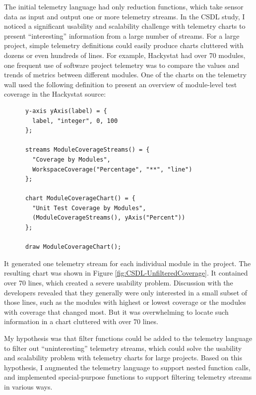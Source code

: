 The initial telemetry language had only reduction functions, which take sensor data as input and output one or more telemetry streams. In the CSDL study, I noticed a significant usability and scalability challenge with telemetry charts to present ``interesting'' information from a large number of streams. For a large project, simple telemetry definitions could easily produce charts cluttered with dozens or even hundreds of lines. For example, Hackystat had over 70 modules, one frequent use of software project telemetry was to compare the values and trends of metrics between different modules. One of the charts on the telemetry wall used the following definition to present an overview of module-level test coverage in the Hackystat source: 

\begin{verbatim}
      y-axis yAxis(label) = {
        label, "integer", 0, 100
      };

      streams ModuleCoverageStreams() = {
        "Coverage by Modules",
        WorkspaceCoverage("Percentage", "**", "line")
      };

      chart ModuleCoverageChart() = {
        "Unit Test Coverage by Modules",
        (ModuleCoverageStreams(), yAxis("Percent"))
      };

      draw ModuleCoverageChart();
\end{verbatim}

It generated one telemetry stream for each individual module in the project. The resulting chart was shown in Figure \ref{fig:CSDL-UnfilteredCoverage}. It contained over 70 lines, which created a severe usability problem. Discussion with the developers revealed that they generally were only interested in a small subset of those lines, such as the modules with highest or lowest coverage or the modules with coverage that changed most. But it was overwhelming to locate such information in a chart cluttered with over 70 lines. 

My hypothesis was that filter functions could be added to the telemetry language to filter out ``uninteresting'' telemetry streams, which could solve the usability and scalability problem with telemetry charts for large projects. Based on this hypothesis, I augmented the telemetry language to support nested function calls, and implemented special-purpose functions to support filtering telemetry streams in various ways.

